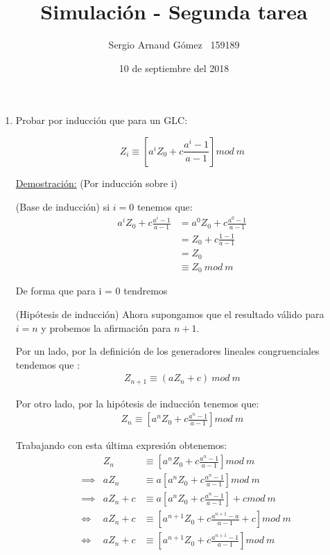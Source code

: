 \documentclass[12 pt]{article}
\title{Simulación - Segunda tarea}
\author{Sergio Arnaud Gómez \quad \quad \ 159189}
\date{10 de septiembre del 2018}
\begin{document}
\maketitle
\begin{enumerate}
    

    \item Probar por inducción que para un GLC:
    
    \[ Z_i \equiv \left[a^iZ_0 + c\frac{a^i - 1}{a - 1}\right] mod \ m \] 
    
    \underline{Demostración:} (Por inducción sobre i)
    
    (Base de inducción) si $i=0$ tenemos que:
    \begin{align*}
        a^iZ_0 + c\frac{a ^i - 1}{a - 1} &=
        a^0Z_0 + c\frac{a^0 - 1}{a - 1}\\ &=
        Z_0 + c\frac{1 - 1}{a - 1} \\ &=
        Z_0 \\ &\equiv Z_0 \ mod  \ m
    \end{align*}
    
    De forma que para i = 0 tendremos 
    
    (Hipótesis de inducción) Ahora supongamos que el resultado válido para $i=n$ y probemos la afirmación para $n+1$. 
    
    Por un lado, por la definición de los generadores lineales congruenciales tendemos que :
    \begin{align*}
        Z_{n+1} \equiv (aZ_n + c) \ mod \ m \tag{1} \label{eq:1}
    \end{align*}
    
    Por otro lado, por la hipótesis de inducción tenemos que:
    \begin{align*}
        Z_n \equiv \left[a^nZ_0 + c\frac{a^n - 1}{a - 1}\right] mod \ m 
    \end{align*}
    
    Trabajando con esta última expresión obtenemos:
    \begin{align*}
        & & Z_n &\equiv \left[a^nZ_0 + c\frac{a^n - 1}{a - 1}\right] mod \ m \\
        & \implies & aZ_n &\equiv a\left[a^nZ_0 + c\frac{a^n - 1}{a - 1}\right] mod \ m \\
        & \implies & aZ_n + c &\equiv a\left[a^nZ_0 + c\frac{a^n - 1}{a - 1}\right] + c mod \ m \\
        & \iff & aZ_n + c &\equiv \left[a^{n+1}Z_0 + c\frac{a^{n+1} - a}{a - 1} + c\right] mod \ m \\
        & \iff & aZ_n + c &\equiv \left[a^{n+1}Z_0 + c\frac{a^{n+1} - 1}{a - 1} \right] mod \ m  \tag{2} \label{eq:2} \\ 
    \end{align*}
    

\end{enumerate}
\end{document}
